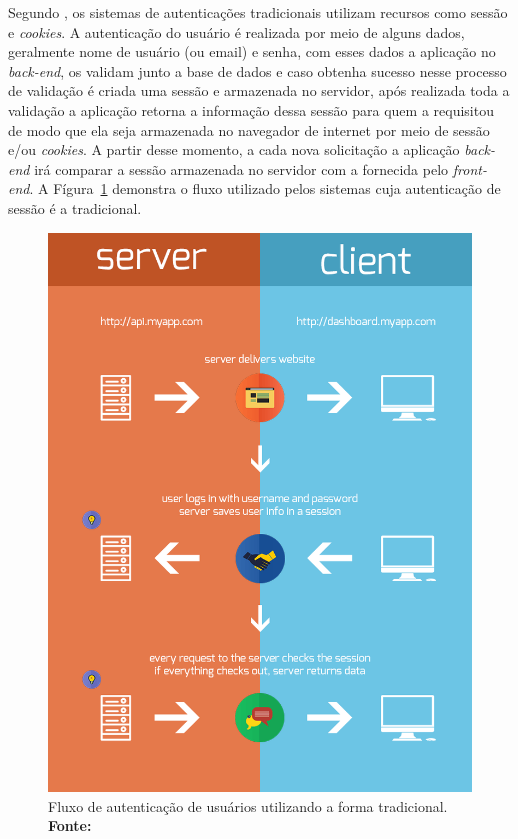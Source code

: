 Segundo , os sistemas de autenticações tradicionais utilizam recursos como sessão e \textit{cookies}. A autenticação do usuário é realizada por meio de alguns dados, geralmente nome de usuário (ou email) e senha, com esses dados a aplicação no \textit{back-end}, os validam junto a base de dados e caso obtenha sucesso nesse processo de validação é criada uma sessão e armazenada no servidor, após realizada toda a validação a aplicação retorna a informação dessa sessão para quem a requisitou de modo que ela seja armazenada no navegador de internet por meio de sessão e/ou \textit{cookies}. A partir desse momento, a cada nova solicitação a aplicação \textit{back-end} irá comparar a sessão armazenada no servidor com a fornecida pelo \textit{front-end}. A Fígura~\ref{fig:autenticacao_via_sessao} demonstra o fluxo utilizado pelos sistemas cuja autenticação de sessão é a tradicional.

\newpage
\begin{figure}[h!]
	\centerline{\includegraphics[scale=0.55]{./imagens/tokens-traditional.png}}
	\caption[Fluxo de autenticação de usuários utilizando a forma tradicional]
	{Fluxo de autenticação de usuários utilizando a forma tradicional. \textbf{Fonte:} \cite{authentication_via_token_chris_sevilleja}}
	\label{fig:autenticacao_via_sessao}
\end{figure}

